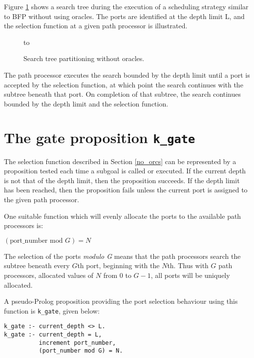Figure \ref{port_tree} shows a search tree during the execution of
a scheduling strategy similar to BFP without using oracles.  The ports
are identified at the depth limit L,  and the selection function at a
given path processor is illustrated.

\begin{figure}[htbp]
\vspace{5mm} \hbox to 
\caption{Search tree partitioning without oracles.}
\vspace{5mm}
\label{port_tree}
\end{figure}

The path processor executes the search bounded by the depth limit until
a port is accepted by the selection function, at which point the search
continues with the subtree beneath that port.  On completion of that
subtree,  the search continues bounded by the depth limit and the
selection function.

\section{The gate proposition \texttt{k\_{}gate}} %

The selection function described in Section \ref{no_orcs} 
can be represented by a proposition tested each time
a subgoal is called or executed.  If the current depth is not that of the
depth limit, then the proposition succeeds.  If the depth limit has been
reached, then the proposition fails unless the current port is assigned
to the given path processor.

One suitable function which will evenly allocate the ports to the
available path processors is:\\
\centerline{$(\mbox{port\_{}number mod } G) = N$}

The selection of the ports \textit{modulo G} means that the path
processors search the subtree beneath every $G$th port, beginning
with the $N$th.  Thus with $G$ path processors, allocated values of
$N$ from 0 to $G-1$, all ports will be uniquely allocated.

A pseudo-Prolog proposition providing the port
selection behaviour using this function is \texttt{k\_{}gate}, given
below:
\begin{verbatim}
k_gate :- current_depth <> L.
k_gate :- current_depth = L, 
          increment port_number, 
          (port_number mod G) = N.
\end{verbatim}


